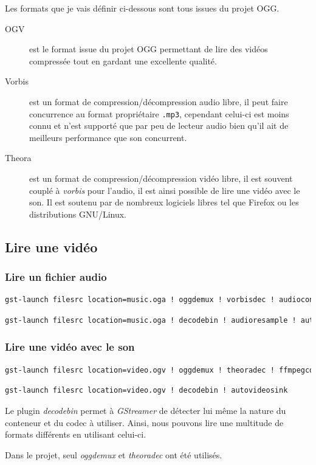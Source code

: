 \documentclass[a4paper, 11pt]{article}
\begin{document}
	Les formats que je vais définir ci-dessous sont tous issues du projet OGG.
	\begin{description}
		\item[OGV] est le format issue du projet OGG permettant de lire des vidéos compressée tout en gardant une excellente qualité.
		\item[Vorbis] est un format de compression/décompression audio libre, il peut faire concurrence au format propriétaire \texttt{.mp3}, cependant celui-ci est
			moins connu et n'est supporté que par peu de lecteur audio bien qu'il ait de meilleurs performance que son concurrent.
		\item[Theora] est un format de compression/décompression vidéo libre, il est souvent couplé à \textit{vorbis} pour l'audio, il est ainsi possible de lire une
			vidéo avec le son. Il est soutenu par de nombreux logiciels libres tel que Firefox ou les distributions GNU/Linux. 
	\end{description}
	\subsection{Lire une vidéo}
	\subsubsection{Lire un fichier audio}
	\begin{lstlisting}[numbers=none,language=sh, caption=Lire un fichier audio -- Uniquement pour les fichier \texttt{.oga}]
gst-launch filesrc location=music.oga ! oggdemux ! vorbisdec ! audioconvert ! alsasink
	\end{lstlisting}
	\begin{lstlisting}[numbers=none,language=sh, caption=Lire un fichier audio -- Pour tous les formats audio]
gst-launch filesrc location=music.oga ! decodebin ! audioresample ! autoaudiosink
	\end{lstlisting}
	\subsubsection{Lire une vidéo avec le son}
	\begin{lstlisting}[numbers=none,language=sh, caption=Lire une vidéo -- Uniquement pour les fichier \texttt{.ogv}]
gst-launch filesrc location=video.ogv ! oggdemux ! theoradec ! ffmpegcolorspace ! autovideosink
	\end{lstlisting}
	\begin{lstlisting}[numbers=none,language=sh, caption=Lire une vidéo -- Pour tous les formats audio-vidéos]
gst-launch filesrc location=video.ogv ! decodebin ! autovideosink
	\end{lstlisting}
	\begin{remarque}
		Le plugin \textit{decodebin} permet à \textit{GStreamer} de détecter lui même la nature du conteneur et du codec à utiliser. Ainsi, nous pouvons lire une multitude de
		formats différents en utilisant celui-ci.

		Dans le projet, seul \textit{oggdemux} et \textit{theoradec} ont été utilisés.
	\end{remarque}
\end{document}
